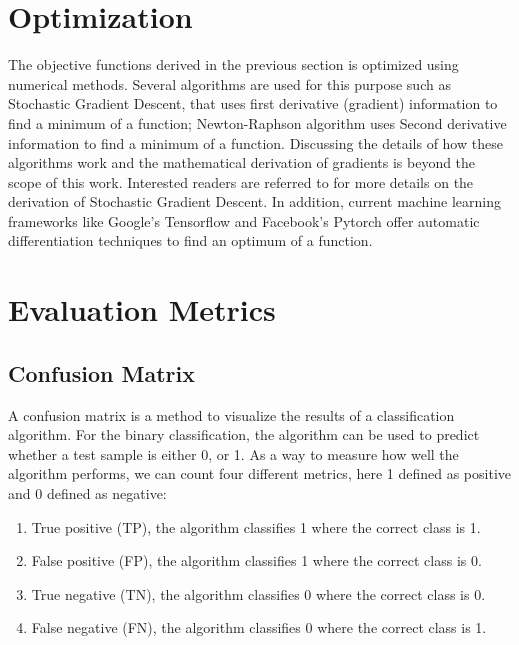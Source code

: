 \section{Optimization}

The objective functions derived in the previous section is optimized  using numerical methods. Several algorithms are used for this purpose such as Stochastic Gradient Descent, that uses first derivative (gradient) information to find a minimum of a function; Newton-Raphson algorithm uses Second derivative information to find a minimum of a function. Discussing the details of how these algorithms work and the mathematical derivation of gradients is beyond the scope of this work. Interested readers are referred to \citep{jurafsky2014speech} for more details on the derivation of Stochastic Gradient Descent. In addition, current machine learning frameworks like Google's Tensorflow and Facebook's Pytorch offer automatic differentiation techniques to find an optimum of a function. 

\section{Evaluation Metrics}
\subsection{Confusion Matrix}

A confusion matrix is a method to visualize the results of a classification algorithm. For the binary classification, the algorithm can be used to predict whether a test sample is either 0, or 1. As a way to measure how well the algorithm performs, we can count four different metrics, here 1 defined as positive and 0 defined as negative:

\begin{enumerate}

\item True positive (TP), the algorithm classifies 1 where the correct class is 1.
\item False positive (FP), the algorithm classifies 1 where the correct class is 0.
\item True negative (TN), the algorithm classifies 0 where the correct class is 0.
\item False negative (FN), the algorithm classifies 0 where the correct class is 1.

\end{enumerate}

